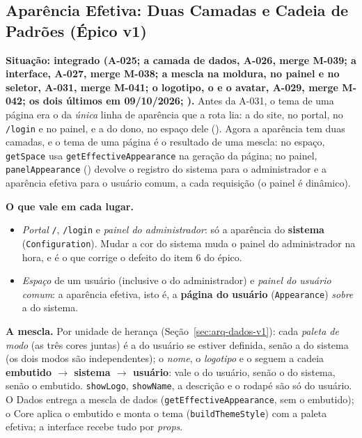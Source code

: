 \subsection{Aparência Efetiva: Duas Camadas e Cadeia de Padrões (Épico v1)}\label{sec:arq-tema-efetiva}

\textbf{Situação: integrado (A-025; a camada de dados, A-026, merge M-039; a interface, A-027, merge M-038; a mescla na moldura, no painel e no seletor, A-031, merge M-041; o logotipo, o  e o avatar, A-029, merge M-042; os dois últimos em 09/10/2026; ).} Antes da A-031, o tema de uma página era o da \emph{única} linha de aparência que a rota lia: a do site, no portal, no \texttt{/login} e no painel, e a do dono, no espaço dele (). Agora a aparência tem duas camadas, e o tema de uma página é o resultado de uma mescla: no espaço, \texttt{getSpace} usa \texttt{getEffectiveAppearance} na geração da página; no painel, \texttt{panelAppearance} () devolve o registro do sistema para o administrador e a aparência efetiva para o usuário comum, a cada requisição (o painel é dinâmico).

\textbf{O que vale em cada lugar.}
\begin{itemize}
  \item \emph{Portal} \texttt{/}, \texttt{/login} e \emph{painel do administrador}: só a aparência do \textbf{sistema} (\texttt{Configuration}). Mudar a cor do sistema muda o painel do administrador na hora, e é o que corrige o defeito do item 6 do épico.
  \item \emph{Espaço} de um usuário (inclusive o do administrador) e \emph{painel do usuário comum}: a aparência efetiva, isto é, a \textbf{página do usuário} (\texttt{Appearance}) \emph{sobre} a do sistema.
\end{itemize}

\textbf{A mescla.} Por unidade de herança (Seção~\ref{sec:arq-dados-v1}): cada \emph{paleta de modo} (as três cores juntas) é a do usuário se estiver definida, senão a do sistema (os dois modos são independentes); o \emph{nome}, o \emph{logotipo} e o  seguem a cadeia \textbf{embutido $\rightarrow$ sistema $\rightarrow$ usuário}: vale o do usuário, senão o do sistema, senão o embutido. \texttt{showLogo}, \texttt{showName}, a descrição e o rodapé são só do usuário. O Dados entrega a mescla de dados (\texttt{getEffectiveAppearance}, sem o embutido); o Core aplica o embutido e monta o tema (\texttt{buildThemeStyle}) com a paleta efetiva; a interface recebe tudo por \emph{props}.

